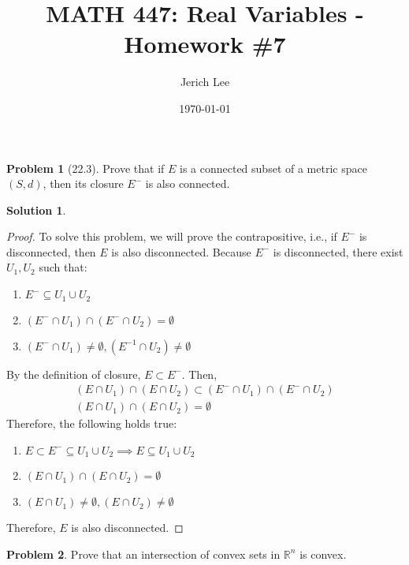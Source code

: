 \documentclass[12pt]{article}
\title{MATH 447: Real Variables - Homework \#7}
\author{Jerich Lee}
\date{\today}
\theoremstyle{definition} %
\newtheorem{solution}{Solution}
\newtheorem{problem}{Problem}
\theoremstyle{plain} %
\begin{document}
\maketitle

\begin{problem}[22.3]
Prove that if $E$ is a connected subset of a metric space $(S, d)$, then its closure $E^-$ is also connected.
\end{problem}
\begin{solution}
    \begin{proof}
        To solve this problem, we will prove the contrapositive, i.e., if \(E^{-}\) is disconnected, then \(E\) is also disconnected. Because \(E^{-}\) is disconnected, there exist \(U_1, U_2\) such that:
    \begin{enumerate}
        \item \(E^{-}\subseteq U_1 \cup U_2\) 
        \item \((E^{-}\cap U_1)\cap (E^{-}\cap U_2)=\emptyset\)
        \item \((E^{-}\cap U_1) \neq \emptyset, (E^{-1}\cap U_{2})\neq \emptyset\)   
    \end{enumerate}  By the definition of closure, \(E \subset E^{-}\). Then, 
    \begin{align}
        (E\cap U_1)\cap (E\cap U_2)\subset (E^{-}\cap U_1)\cap (E^{-}\cap U_2) \\[10pt] 
        (E\cap U_1)\cap (E\cap U_2)=\emptyset 
    \end{align}  Therefore, the following holds true:
    \begin{enumerate}
    \item \(E \subset E^{-} \subseteq U_1 \cup U_2\implies E \subseteq U_1 \cup U_2\)  
    \item \((E\cap U_1)\cap (E\cap U_2)=\emptyset\)
    \item \((E\cap U_1)\neq \emptyset, (E\cap U_{2})\neq \emptyset\)   
    \end{enumerate}
    Therefore, \(E\) is also disconnected.
\end{proof}
\end{solution}
\begin{problem}
Prove that an intersection of convex sets in $\mathbb{R}^n$ is convex.
\end{problem}
\end{document}
